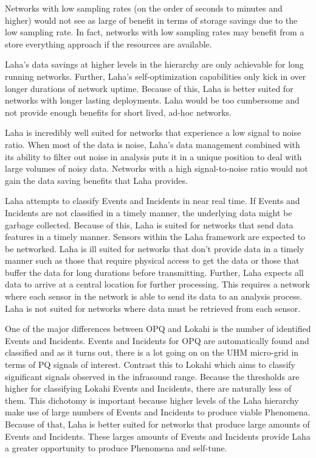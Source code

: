 Networks with low sampling rates (on the order of seconds to minutes and higher) would not see as large of benefit in terms of storage savings due to the low sampling rate. In fact, networks with low sampling rates may benefit from a store everything approach if the resources are available.

Laha's data savings at higher levels in the hierarchy are only achievable for long running networks. Further, Laha's self-optimization capabilities only kick in over longer durations of network uptime. Because of this, Laha is better suited for networks with longer lasting deployments. Laha would be too cumbersome and not provide enough benefits for short lived, ad-hoc networks.

Laha is incredibly well suited for networks that experience a low signal to noise ratio. When most of the data is noise, Laha's data management combined with its ability to filter out noise in analysis puts it in a unique position to deal with large volumes of noisy data. Networks with a high signal-to-noise ratio would not gain the data saving benefits that Laha provides.

Laha attempts to classify Events and Incidents in near real time. If Events and Incidents are not classified in a timely manner, the underlying data might be garbage collected. Because of this, Laha is suited for networks that send data features in a timely manner. Sensors within the Laha framework are expected to be networked. Laha is ill suited for networks that don't provide data in a timely manner such as those that require physical access to get the data or those that buffer the data for long durations before transmitting. Further, Laha expects all data to arrive at a central location for further processing. This requires a network where each sensor in the network is able to send its data to an analysis process. Laha is not suited for networks where data must be retrieved from each sensor.

One of the major differences between OPQ and Lokahi is the number of identified Events and Incidents. Events and Incidents for OPQ are automatically found and classified and as it turns out, there is a lot going on on the UHM micro-grid in terms of PQ signals of interest. Contrast this to Lokahi which aims to classify significant signals observed in the infrasound range. Because the thresholds are higher for classifying Lokahi Events and Incidents, there are naturally less of them. This dichotomy is important because higher levels of the Laha hierarchy make use of large numbers of Events and Incidents to produce viable Phenomena. Because of that, Laha is better suited for networks that produce large amounts of Events and Incidents. These larges amounts of Events and Incidents provide Laha a greater opportunity to produce Phenomena and self-tune.

